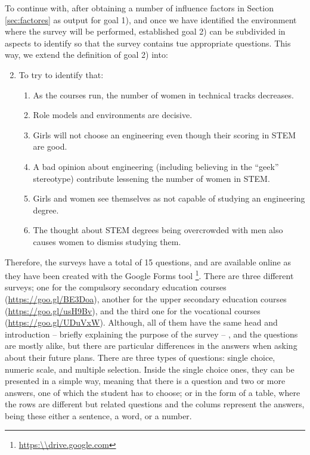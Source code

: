 \documentclass[journal,transmag]{IEEEtran}
\begin{document}
To continue with, after obtaining a number of influence factors in Section \ref{sec:factores} as output for goal 1), and once we have identified the environment where the survey will be performed, established goal 2) can be subdivided in aspects to identify so that the survey contains tue appropriate questions. This way, we extend the definition of goal 2) into:

\begin{enumerate}
  \setcounter{enumi}{1}
  \item To try to identify that:
  \begin{enumerate}
  \item As the courses run, the number of women in technical tracks decreases.
  \item Role models and environments are decisive.
  \item Girls will not choose an engineering even though their scoring in STEM are good.
  \item A bad opinion about engineering (including believing in the ``geek'' stereotype) contribute lessening the number of women in STEM.
  \item Girls and women see themselves as not capable of studying an engineering degree.
  \item The thought about STEM degrees being overcrowded with men also causes women to dismiss studying them.
  \end{enumerate}
\end{enumerate}

Therefore, the surveys have a total of 15 questions, and are available online as they have been created with the Google Forms tool \footnote{\url{https:\\drive.google.com}}. There are three different surveys; one for the compulsory secondary education courses (\url{https://goo.gl/BE3Doa}), another for the upper secondary education courses (\url{https://goo.gl/usH9Bv}), and the third one for the vocational courses (\url{https://goo.gl/UDuVxW}). Although, all of them have the same head and introduction -- briefly explaining the purpose of the survey -- \cite{cohen2013research}, and the questions are mostly alike, but there are particular differences in the answers when asking about their future plans. There are three types of questions: single choice, numeric scale, and multiple selection. Inside the single choice ones, they can be presented in a simple way, meaning that there is a question and two or more answers, one of which the student has to choose; or in the form of a table, where the rows are different but related questions and the colums represent the answers, being these either a sentence, a word, or a number.
\end{document}
